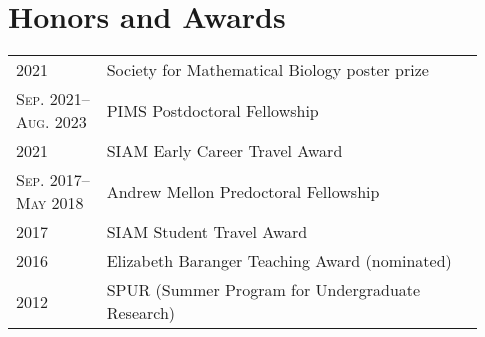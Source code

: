 \documentclass[a4paper,10pt]{article}
\begin{document}
\section{Honors and Awards}
\begin{tabular}{p{0.18\linewidth}p{0.75\linewidth}}
\textsc{2021} & Society for Mathematical Biology poster prize\\
\textsc{Sep. 2021--Aug. 2023} & PIMS Postdoctoral Fellowship\\
\textsc{2021} & SIAM Early Career Travel Award\\
\textsc{Sep. 2017--May 2018} & Andrew Mellon Predoctoral Fellowship\\
\textsc{2017} & SIAM Student Travel Award\\
\textsc{2016} & Elizabeth Baranger Teaching Award (nominated)\\
\textsc{2012} & SPUR (Summer Program for Undergraduate Research)\\
\end{tabular}
\end{document}
